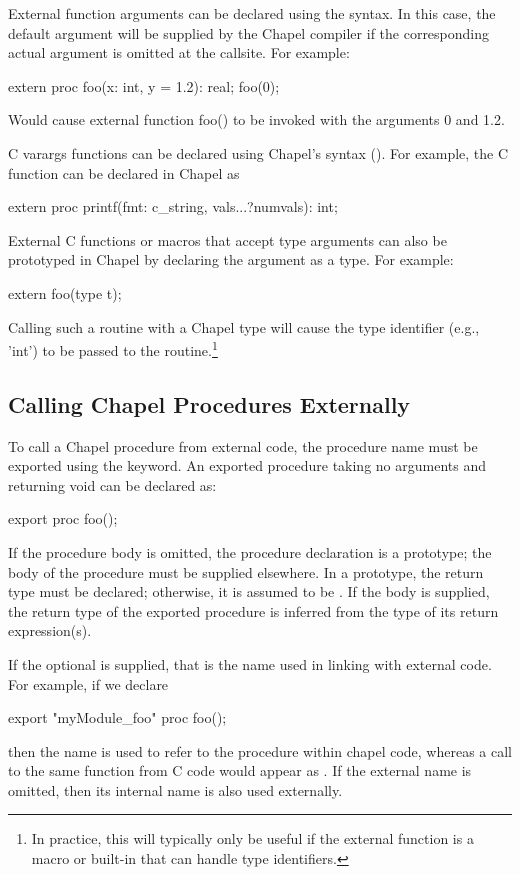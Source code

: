 External function arguments can be declared using the 
syntax.  In this case, the default argument will be supplied by the Chapel
compiler if the corresponding actual argument is omitted at the callsite.  For example:
\begin{chapel}
       extern proc foo(x: int, y = 1.2): real;
       foo(0);
\end{chapel}
Would cause external function foo() to be invoked with the arguments 0
and 1.2.

C varargs functions can be declared using
Chapel's  syntax ().  For example,
the C  function can be declared in Chapel as
\begin{chapel}
       extern proc printf(fmt: c_string, vals...?numvals): int;
\end{chapel}

External C functions or macros that accept type arguments can also be
prototyped in Chapel by declaring the argument as a type.  For
example:
\begin{chapel}
       extern foo(type t);
\end{chapel}
Calling such a routine with a Chapel type will cause the type
identifier (e.g., 'int') to be passed to the routine.\footnote{In practice,
this will typically only be useful if the external function is a macro
or built-in that can handle type identifiers.}

\subsection{Calling Chapel Procedures Externally}
\label{Calling_Chapel_Procedures_Externally}

To call a Chapel procedure from external code, the procedure name must be
exported using the  keyword.  An exported procedure taking no
arguments and returning void can be declared as:
\begin{chapel}
export proc foo();
\end{chapel}
If the procedure body is omitted, the procedure declaration is a prototype; the
body of the procedure must be supplied elsewhere.  In a prototype, the return
type must be declared; otherwise, it is assumed to be .  If the body
is supplied, the return type of the exported procedure is inferred from the
type of its return expression(s).  

If the optional  is supplied, that is the name used in
linking with external code.  For example, if we declare
\begin{chapel}
export "myModule_foo" proc foo();
\end{chapel}
\noindent
then the name  is used to refer to the procedure within chapel code,
whereas a call to the same function from C code would appear
as .  If the external name is omitted, then its internal
name is also used externally.

